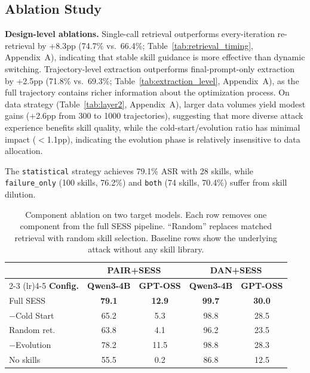 \documentclass{article} %
\begin{document}
\subsection{Ablation Study}

\textbf{Design-level ablations.} Single-call retrieval outperforms every-iteration re-retrieval by +8.3pp (74.7\% vs.\ 66.4\%; Table~\ref{tab:retrieval_timing}, Appendix~A), indicating that stable skill guidance is more effective than dynamic switching. Trajectory-level extraction outperforms final-prompt-only extraction by +2.5pp (71.8\% vs.\ 69.3\%; Table~\ref{tab:extraction_level}, Appendix~A), as the full trajectory contains richer information about the optimization process. On data strategy (Table~\ref{tab:layer2}, Appendix~A), larger data volumes yield modest gains (+2.6pp from 300 to 1000 trajectories), suggesting that more diverse attack experience benefits skill quality, while the cold-start/evolution ratio has minimal impact ($<$1.1pp), indicating the evolution phase is relatively insensitive to data allocation.

The \texttt{statistical} strategy achieves 79.1\% ASR with 28 skills, while \texttt{failure\_only} (100 skills, 76.2\%) and \texttt{both} (74 skills, 70.4\%) suffer from skill dilution.

\begin{table}[t]
\centering
\caption{Component ablation on two target models. Each row removes one component from the full SESS pipeline. ``Random'' replaces matched retrieval with random skill selection. Baseline rows show the underlying attack without any skill library.}
\label{tab:ablation}
\footnotesize
\setlength{\tabcolsep}{2.5pt}
\begin{tabular}{lcccc}
\toprule
& \multicolumn{2}{c}{\textbf{PAIR+SESS}} & \multicolumn{2}{c}{\textbf{DAN+SESS}} \\
\cmidrule(lr){2-3} \cmidrule(lr){4-5}
\textbf{Config.} & \textbf{Qwen3-4B} & \textbf{GPT-OSS} & \textbf{Qwen3-4B} & \textbf{GPT-OSS} \\
\midrule
Full SESS & \textbf{79.1} & \textbf{12.9} & \textbf{99.7} & \textbf{30.0} \\
\quad $-$Cold Start & 65.2 & 5.3 & 98.8 & 28.5 \\
\quad Random ret. & 63.8 & 4.1 & 96.2 & 23.5 \\
\quad $-$Evolution & 78.2 & 11.5 & 98.8 & 28.3 \\
\midrule
No skills & 55.5 & 0.2 & 86.8 & 12.5 \\
\bottomrule
\end{tabular}
\end{table}
\end{document}
